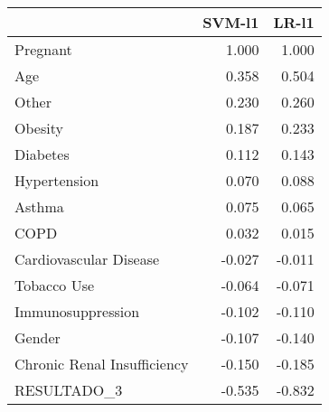 \begin{tabular}{lrr}
\toprule
{} &  SVM-l1 &  LR-l1 \\
\midrule
Pregnant                    &   1.000 &  1.000 \\
Age                         &   0.358 &  0.504 \\
Other                       &   0.230 &  0.260 \\
Obesity                     &   0.187 &  0.233 \\
Diabetes                    &   0.112 &  0.143 \\
Hypertension                &   0.070 &  0.088 \\
Asthma                      &   0.075 &  0.065 \\
COPD                        &   0.032 &  0.015 \\
Cardiovascular Disease      &  -0.027 & -0.011 \\
Tobacco Use                 &  -0.064 & -0.071 \\
Immunosuppression           &  -0.102 & -0.110 \\
Gender                      &  -0.107 & -0.140 \\
Chronic Renal Insufficiency &  -0.150 & -0.185 \\
RESULTADO\_3                 &  -0.535 & -0.832 \\
\bottomrule
\end{tabular}

